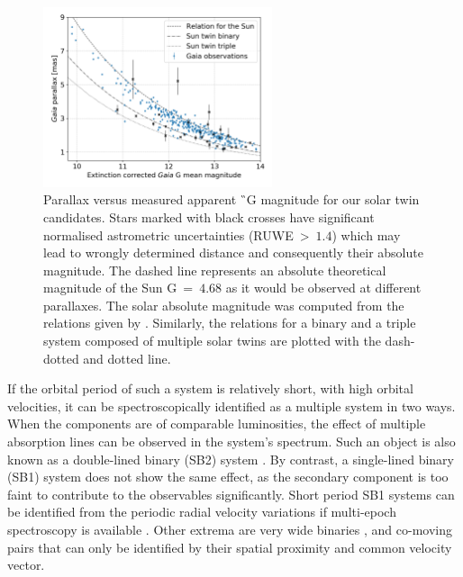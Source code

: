 \begin{figure}
	\centering
	\includegraphics[width=0.6\textwidth]{mag_parallax_gaia_ebv_c3_07.png}
	\caption{Parallax versus measured apparent \G\ G magnitude for our solar twin candidates. Stars marked with black crosses have significant normalised astrometric uncertainties (RUWE~>~$1.4$) which may lead to wrongly determined distance and consequently their absolute magnitude. The dashed line represents an absolute theoretical magnitude of the Sun G~=~$4.68$ as it would be observed at different parallaxes. The solar absolute magnitude was computed from the relations given by \citet{2018arXiv180409368E}. Similarly, the relations for a binary and a triple system composed of multiple solar twins are plotted with the dash-dotted and dotted line.}
	\label{fig:par_gmean}
\end{figure}

If the orbital period of such a system is relatively short, with high orbital velocities, it can be spectroscopically identified as a multiple system in two ways. When the components are of comparable luminosities, the effect of multiple absorption lines can be observed in the system's spectrum. Such an object is also known as a double-lined binary (SB2) system \cite{2004A&A...424..727P, 2010AJ....140..184M, 2017PASP..129h4201F, 2017A&A...608A..95M}. By contrast, a single-lined binary (SB1) system does not show the same effect, as the secondary component is too faint to contribute to the observables significantly. Short period SB1 systems can be identified from the periodic radial velocity variations if multi-epoch spectroscopy is available \cite{1991A&A...248..485D, 2004A&A...418..989N, 2011AJ....141..200M, 2016AJ....151...85T, 2018ApJ...854..147B}. Other extrema are very wide binaries \cite{1988ApJ...335L..47G, 1990AJ....100.1968C, 1995ApJ...441..200G, 2009ApJ...703.1511K, 2011ApJS..192....2S, 2017MNRAS.472..675A, 2018MNRAS.480.4302C}, and co-moving pairs \cite{2017AJ....153..257O, 2019AJ....157...78J} that can only be identified by their spatial proximity and common velocity vector.


